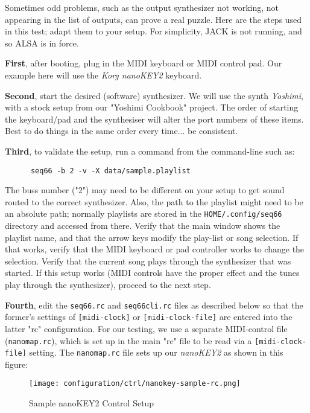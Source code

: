    Sometimes odd problems, such as the output synthesizer not working, not
   appearing in the list of outputs, can prove a real puzzle.
   Here are the steps used in this test; adapt them to your setup.  For
   simplicity, JACK is not running, and so ALSA is in force.

   \textbf{First}, after booting, plug in the MIDI keyboard or MIDI control
   pad.  Our example here will use the \textsl{Korg nanoKEY2} keyboard.  

   \textbf{Second}, start the desired (software) synthesizer.  We will use the
   synth \textsl{Yoshimi}, with a stock setup from our "Yoshimi Cookbook"
   project.  The order of starting the keyboard/pad and the synthesiser
   will alter the port numbers of these items.  Best to do things in the same
   order every time... be consistent.

   \textbf{Third}, to validate the setup, run a command from the command-line
   such as:

   \begin{verbatim}
      seq66 -b 2 -v -X data/sample.playlist
   \end{verbatim}

   The buss number ("2") may need to be different on your setup to get sound
   routed to the correct synthesizer.  Also, the path to the playlist might
   need to be an absolute path; normally playlists are stored in the
   \texttt{HOME/.config/seq66} directory and accessed from there.
   Verify that the main window shows the playlist name, and that the arrow keys
   modify the play-list or song selection.  If that works, verify that the MIDI
   keyboard or pad controller works to change the selection.
   Verify that the current song plays through the synthesizer that was started.
   If this setup works (MIDI controls have the proper effect and the tunes play
   through the synthesizer), proceed to the next step.

   \textbf{Fourth}, edit the \texttt{seq66.rc} and \texttt{seq66cli.rc}
   files as described below so that the former's settings of
   \texttt{[midi-clock]} or \texttt{[midi-clock-file]} are entered into the
   latter "rc" configuration.
   For our testing, we use a separate MIDI-control file 
   (\texttt{nanomap.rc}), which is set up
   in the main "rc" file to be read via a \texttt{[midi-clock-file]}
   setting.  The \texttt{nanomap.rc} file sets up our \textsl{nanoKEY2} as
   shown in this figure:

\begin{figure}[H]
   \centering 
   \texttt{[image: configuration/ctrl/nanokey-sample-rc.png]}
   \caption{Sample nanoKEY2 Control Setup}
   \label{fig:headless_nanokey2_setup}
\end{figure}

